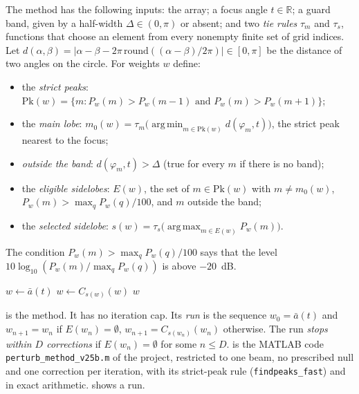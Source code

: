 \documentclass[11pt]{amsart}
\theoremstyle{plain}
\theoremstyle{definition}
\newcommand{\thy}[1]{\texttt{#1}}
\newcommand{\R}{\mathbb{R}}
\newcommand{\ab}{\bar a}
\newcommand{\dist}{d}
\newcommand{\Pk}{\mathrm{Pk}}
\newcommand{\El}{E}
\DeclareMathOperator*{\argmax}{arg\,max}
\DeclareMathOperator*{\argmin}{arg\,min}
\begin{document}
The method has the following inputs: the array; a focus angle $t \in \R$; a guard band, given by a
half-width $\Delta \in (0, \pi)$ or absent; and two \emph{tie rules} $\tau_m$ and $\tau_s$, functions
that choose an element from every nonempty finite set of grid indices.  Let
$\dist(\alpha, \beta) = |\alpha - \beta - 2\pi\,\mathrm{round}((\alpha-\beta)/2\pi)| \in [0,\pi]$ be
the distance of two angles on the circle.  For weights $w$ define:

\begin{itemize}
\item the \emph{strict peaks}: $\Pk(w) = \{ m : P_w(m) > P_w(m-1) \text{ and } P_w(m) > P_w(m+1)\}$;
\item the \emph{main lobe}: $m_0(w) = \tau_m\bigl(\argmin_{m \in \Pk(w)} \dist(\varphi_m, t)\bigr)$,
the strict peak nearest to the focus;
\item \emph{outside the band}: $\dist(\varphi_m, t) > \Delta$ (true for every $m$ if there is no band);
\item the \emph{eligible sidelobes}: $\El(w)$, the set of $m \in \Pk(w)$ with $m \neq m_0(w)$,
$P_w(m) > \max_q P_w(q) / 100$, and $m$ outside the band;
\item the \emph{selected sidelobe}: $s(w) = \tau_s\bigl(\argmax_{m \in \El(w)} P_w(m)\bigr)$.
\end{itemize}
The condition $P_w(m) > \max_q P_w(q)/100$ says that the level $10\log_{10}(P_w(m)/\max_q P_w(q))$
is above $-20$~dB.

\begin{algorithm}[t]
\caption{The perturbative method (one beam, one correction per iteration).}\label{alg:method}
\begin{algorithmic}[1]
\State $w \gets \ab(t)$ 
\While{$\El(w) \neq \emptyset$}
  \State $w \gets C_{s(w)}(w)$ 
\EndWhile
\State \Return $w$
\end{algorithmic}
\end{algorithm}

 is the method.  It has no iteration cap.  Its \emph{run} is the sequence
$w_0 = \ab(t)$ and $w_{n+1} = w_n$ if $\El(w_n) = \emptyset$, $w_{n+1} = C_{s(w_n)}(w_n)$
otherwise.  The run \emph{stops within $D$ corrections} if $\El(w_n) = \emptyset$ for some
$n \le D$.   is the MATLAB code \thy{perturb\_method\_v25b.m} of the project,
restricted to one beam, no prescribed null and one correction per iteration, with its strict-peak
rule (\thy{findpeaks\_fast}) and in exact arithmetic.   shows a run.
\end{document}
